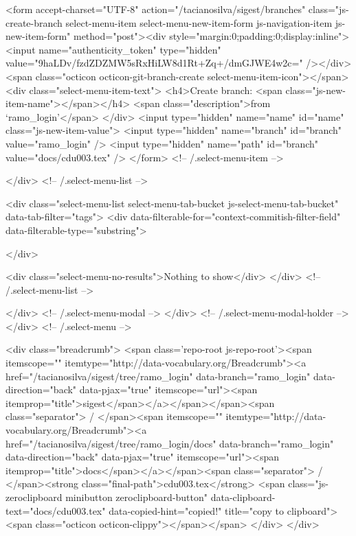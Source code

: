           <form accept-charset="UTF-8" action="/tacianosilva/sigest/branches" class="js-create-branch select-menu-item select-menu-new-item-form js-navigation-item js-new-item-form" method="post"><div style="margin:0;padding:0;display:inline"><input name="authenticity_token" type="hidden" value="9haLDv/fzdZDZMW5sRxHiLW8d1Rt+Zq+/dmGJWE4w2c=" /></div>
            <span class="octicon octicon-git-branch-create select-menu-item-icon"></span>
            <div class="select-menu-item-text">
              <h4>Create branch: <span class="js-new-item-name"></span></h4>
              <span class="description">from ‘ramo_login’</span>
            </div>
            <input type="hidden" name="name" id="name" class="js-new-item-value">
            <input type="hidden" name="branch" id="branch" value="ramo_login" />
            <input type="hidden" name="path" id="branch" value="docs/cdu003.tex" />
          </form> <!-- /.select-menu-item -->

      </div> <!-- /.select-menu-list -->

      <div class="select-menu-list select-menu-tab-bucket js-select-menu-tab-bucket" data-tab-filter="tags">
        <div data-filterable-for="context-commitish-filter-field" data-filterable-type="substring">


        </div>

        <div class="select-menu-no-results">Nothing to show</div>
      </div> <!-- /.select-menu-list -->

    </div> <!-- /.select-menu-modal -->
  </div> <!-- /.select-menu-modal-holder -->
</div> <!-- /.select-menu -->

  <div class="breadcrumb">
    <span class='repo-root js-repo-root'><span itemscope="" itemtype="http://data-vocabulary.org/Breadcrumb"><a href="/tacianosilva/sigest/tree/ramo_login" data-branch="ramo_login" data-direction="back" data-pjax="true" itemscope="url"><span itemprop="title">sigest</span></a></span></span><span class="separator"> / </span><span itemscope="" itemtype="http://data-vocabulary.org/Breadcrumb"><a href="/tacianosilva/sigest/tree/ramo_login/docs" data-branch="ramo_login" data-direction="back" data-pjax="true" itemscope="url"><span itemprop="title">docs</span></a></span><span class="separator"> / </span><strong class="final-path">cdu003.tex</strong> <span class="js-zeroclipboard minibutton zeroclipboard-button" data-clipboard-text="docs/cdu003.tex" data-copied-hint="copied!" title="copy to clipboard"><span class="octicon octicon-clippy"></span></span>
  </div>
</div>


